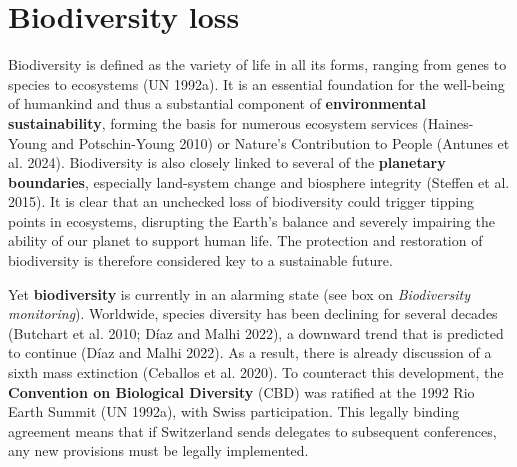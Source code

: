 \documentclass[
  a4paper,
  DIV=11,
  numbers=noendperiod,
  oneside,
  openany]{scrreprt}
\begin{document}
\section{Biodiversity loss}\label{biodiversity-loss}

Biodiversity is defined as the variety of life in all its forms, ranging
from genes to species to ecosystems (UN 1992a). It is an essential
foundation for the well-being of humankind and thus a substantial
component of \textbf{environmental sustainability}, forming the basis
for numerous ecosystem services (Haines-Young and Potschin-Young 2010)
or Nature's Contribution to People (Antunes et al. 2024). Biodiversity
is also closely linked to several of the \textbf{planetary boundaries},
especially land-system change and biosphere integrity ({Steffen et al.}
2015). It is clear that an unchecked loss of biodiversity could trigger
tipping points in ecosystems, disrupting the Earth's balance and
severely impairing the ability of our planet to support human life. The
protection and restoration of biodiversity is therefore considered key
to a sustainable future.

Yet \textbf{biodiversity} is currently in an alarming state (see box on
\emph{Biodiversity monitoring}). Worldwide, species diversity has been
declining for several decades ({Butchart et al.} 2010; Díaz and Malhi
2022), a downward trend that is predicted to continue (Díaz and Malhi
2022). As a result, there is already discussion of a sixth mass
extinction (Ceballos et al. 2020). To counteract this development, the
\textbf{Convention on Biological Diversity} (CBD) was ratified at the
1992 Rio Earth Summit (UN 1992a), with Swiss participation. This legally
binding agreement means that if Switzerland sends delegates to
subsequent conferences, any new provisions must be legally implemented.
\end{document}
